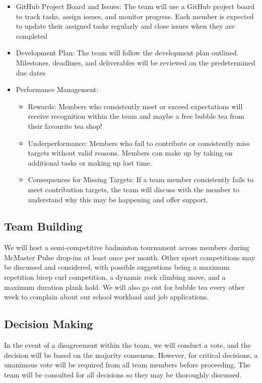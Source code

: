 \documentclass{article}
\begin{document}
\begin{itemize}
    \item GitHub Project Board and Issues: The team will use a GitHub project board to track tasks, assign issues, and monitor progress. Each member is expected to update their assigned tasks regularly and close issues when they are completed
    \item Development Plan: The team will follow the development plan outlined. Milestones, deadlines, and deliverables will be reviewed on the predetermined due dates
    \item Performance Management:
        \begin{itemize}
        \item Rewards: Members who consistently meet or exceed expectations will receive recognition within the team and maybe a free bubble tea from their favourite tea shop!
        \item Underperformance: Members who fail to contribute or consistently miss targets without valid reasons. Members can make up by taking on additional tasks or making up lost time.
        \item Consequences for Missing Targets: If a team member consistently fails to meet contribution targets, the team will discuss with the member to understand why this may be happening and offer support.
        \end{itemize}
\end{itemize}

\subsection{Team Building}

We will host a semi-competitive badminton tournament across members during McMaster Pulse drop-ins at least once per month. Other sport competitions may be discussed and considered, with possible suggestions being a maximum repetition bicep curl competition, a dynamic rock climbing move, and a maximum duration plank hold. We will also go out for bubble tea every other week to complain about our school workload and job applications.

\subsection{Decision Making}

In the event of a disagreement within the team, we will conduct a vote, and the decision will be based on the majority consensus. However, for critical decisions, a unanimous vote will be required from all team members before proceeding. The team will be consulted for all decisions so they may be thoroughly discussed. 
\end{document}
